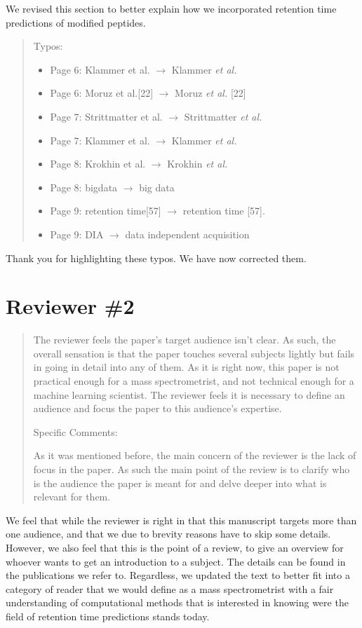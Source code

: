 \documentclass[letterpaper]{article}
\newcommand{\breview}{\begin{quotation}\begin{bf}\noindent}
\newcommand{\ereview}{\end{bf}\end{quotation}}
\begin{document}
We revised this section to better explain how we incorporated
retention time predictions of modified peptides. 

\breview
Typos:
\begin{itemize}
\item Page 6: Klammer et al. $\to$ Klammer {\em et al.}
\item Page 6: Moruz et al.[22] $\to$ Moruz {\em et al.} [22]
\item Page 7: Strittmatter et al. $\to$ Strittmatter {\em et al.}
\item Page 7: Klammer et al. $\to$ Klammer {\em et al.}
\item Page 8: Krokhin et al. $\to$ Krokhin {\em et al.}
\item Page 8: bigdata $\to$ big data
\item Page 9: retention time[57] $\to$ retention time [57].
\item Page 9: DIA $\to$ data independent acquisition
\end{itemize}

\ereview

Thank you for highlighting these typos. We have now corrected them.


\section*{Reviewer \#2}

\breview


The reviewer feels the paper’s target audience isn’t clear. As such,
the overall sensation is that the paper touches several subjects
lightly but fails in going in detail into any of them. As it is right
now, this paper is not practical enough for a mass spectrometrist, and
not technical enough for a machine learning scientist. The reviewer
feels it is necessary to define an audience and focus the paper to
this audience’s expertise.

Specific Comments:

As it was mentioned before, the main concern of the reviewer is the lack of focus in the paper. As such the main point of the review is to clarify who is the audience the paper is meant for and delve deeper into what is relevant for them.

\ereview

We feel that while the reviewer is right in that this manuscript
targets more than one audience, and that we due to brevity reasons
have to skip some details. However, we also feel that this is the point of a review, to give an overview for whoever wants to get an introduction to a subject. The details can be found in the publications we refer to. Regardless, we updated the text to better fit into a category of reader that we would define as a mass spectrometrist with a fair understanding of computational methods that is interested in knowing were the field of retention time predictions stands today.  
\end{document}
